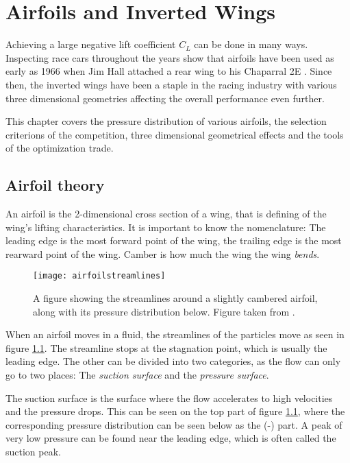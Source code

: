 \chapter{Airfoils and Inverted Wings}      

Achieving a large negative lift coefficient $C_L$ can be done in many ways. Inspecting race cars throughout the years show that airfoils have been used as early as 1966 when Jim Hall attached a rear wing to his Chaparral 2E \cite{hucho}. Since then, the inverted wings have been a staple in the racing industry with various three dimensional geometries affecting the overall performance even further.

This chapter covers the pressure distribution of various airfoils, the selection criterions of the competition, three dimensional geometrical effects and the tools of the optimization trade.

\section{Airfoil theory}

  An airfoil is the 2-dimensional cross section of a wing, that is defining of the wing's lifting characteristics. It is important to know the nomenclature: The leading edge is  the most forward point of the wing, the trailing edge is the most rearward point of the wing. Camber is how much the wing the wing \emph{bends}. 

  \begin{figure}
    \texttt{[image: airfoilstreamlines]}
    \caption{A figure showing the streamlines around a slightly cambered airfoil, along with its pressure distribution below. Figure taken from \cite{jkatz}.}
    \label{fig:airfoilstreamlines}
  \end{figure}

  When an airfoil moves in a fluid, the streamlines of the particles move as seen in figure \ref{fig:airfoilstreamlines}. The streamline stops at the stagnation point, which is usually the leading edge. The other can be divided into two categories, as the flow can only go to two places: The \emph{suction surface} and the \emph{pressure surface}.

  The suction surface is the surface where the flow accelerates to high velocities and the pressure drops. This can be seen on the top part of figure \ref{fig:airfoilstreamlines}, where the corresponding pressure distribution can be seen below as the (-) part. A peak of very low pressure can be found near the leading edge, which is often called the suction peak.

